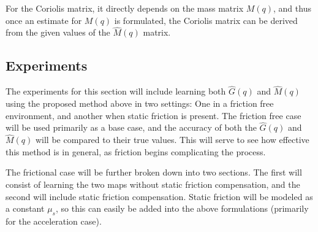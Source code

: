 For the Coriolis matrix, it directly depends on the mass matrix $M(q)$, and thus
once an estimate for $M(q)$ is formulated, the Coriolis matrix can be derived
from the given values of the $\hat{M}(q)$ matrix.

\subsection{Experiments}
The experiments for this section will include learning both $\hat{G}(q)$ and
$\hat{M}(q)$ using the proposed method above in two settings: One in a friction
free environment, and another when static friction is present.
The friction free case will be used primarily as a base case, and the accuracy
of both the $\hat{G}(q)$ and $\hat{M}(q)$ will be compared to their true values.
This will serve to see how effective this method is in general, as
friction begins complicating the process.

The frictional case will be further broken down into two sections.
The first will consist of learning the two maps without static friction
compensation, and the second will include static friction compensation.
Static friction will be modeled as a constant $\mu_{s}$, so this can easily be
added into the above formulations (primarily for the acceleration case).
